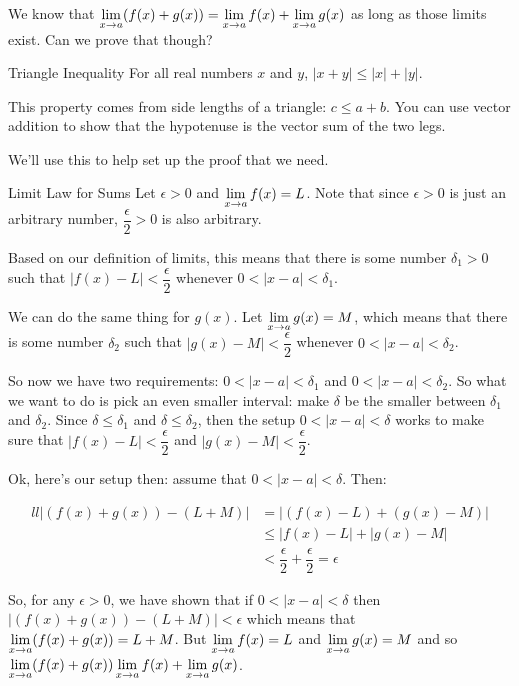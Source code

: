 We know that $\displaystyle \lim_{x\to a} (f(x)+g(x)) = \displaystyle \lim_{x\to a}f(x)+\displaystyle \lim_{x\to a} g(x)$ as long as those limits exist.
Can we prove that though?

\begin{defn}{Triangle Inequality}
For all real numbers $x$ and $y$, $|x+y|\leq|x|+|y|$.

This property comes from side lengths of a triangle: $c\leq a+b$.
You can use vector addition to show that the hypotenuse is the vector sum of the two legs.

We'll use this to help set up the proof that we need.
\end{defn}

\begin{prf}{Limit Law for Sums}
  Let $\epsilon>0$ and $\displaystyle \lim_{x\to a}f(x)=L$.
  Note that since $\epsilon>0$ is just an arbitrary number, $\dfrac{\epsilon}{2}>0$ is also arbitrary.

  Based on our definition of limits, this means that there is some number $\delta_1>0$ such that $|f(x)-L|<\dfrac{\epsilon}{2}$ whenever $0<|x-a|<\delta_1$.

  We can do the same thing for $g(x)$.
  Let $\displaystyle \lim_{x\to a}g(x)=M$, which means that there is some number $\delta_2$ such that $|g(x)-M|<\dfrac{\epsilon}{2}$ whenever $0<|x-a|<\delta_2$.

  So now we have two requirements: $0<|x-a|<\delta_1$ and $0<|x-a|<\delta_2$.
  So what we want to do is pick an even smaller interval: make $\delta$ be the smaller between $\delta_1$ and $\delta_2$.
  Since $\delta\leq\delta_1$ and $\delta\leq\delta_2$, then the setup $0<|x-a|<\delta$ works to make sure that $|f(x)-L|<\dfrac{\epsilon}{2}$ and $|g(x)-M|<\dfrac{\epsilon}{2}$.

  Ok, here's our setup then: assume that $0<|x-a|<\delta$. Then:

  \begin{align*}{ll}
    |\left(f(x)+g(x)\right) - (L+M)| & = |(f(x)-L)+(g(x)-M)|\\
    & \leq |f(x)-L| + |g(x)-M|\\
    &< \dfrac{\epsilon}{2}+\dfrac{\epsilon}{2} = \epsilon
  \end{align*}

  So, for any $\epsilon>0$, we have shown that if $0<|x-a|<\delta$ then $|(f(x)+g(x))-(L+M)|<\epsilon$ which means that $\displaystyle \lim_{x\to a}(f(x)+g(x))=L+M$.
  But $\displaystyle \lim_{x\to a}f(x)=L$ and $\displaystyle \lim_{x\to a}g(x)=M$ and so $\displaystyle \lim_{x\to a}(f(x)+g(x)) \displaystyle \lim_{x\to a}f(x)+\displaystyle \lim_{x\to a}g(x)$.
\end{prf}

